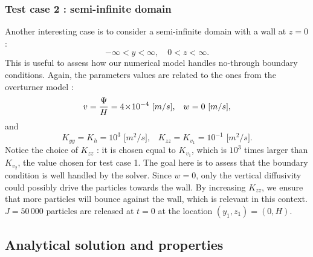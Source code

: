 \subsubsection{Test case 2 : semi-infinite domain}
Another interesting case is to consider a semi-infinite domain with a wall at $z=0$ :
\begin{equation}
	-\infty < y < \infty,\quad 0 < z < \infty.
\end{equation}
This is useful to assess how our numerical model handles no-through boundary conditions. Again, the parameters values are related to the ones from the overturner model :
\begin{equation}
	v = \frac{\Psi}{H} = 4\!\times\!10^{-4}\mbox{ [$m/s$],}\quad  w = 0\mbox{ [$m/s$],}
\end{equation}
and
\begin{equation}
	K_{yy} = K_h = 10^{3} \mbox{ [$m^2/s$],}\quad K_{zz} = K_{v_{1}} = 10^{-1} \mbox{ [$m^2/s$].} 
\end{equation}
Notice the choice  of $K_{zz}$ : it is chosen equal to $K_{v_1}$, which is $10^3$ times larger than $K_{v_2}$, the value chosen for test case 1. The goal here is to assess that the boundary condition is well handled by the solver. Since $w=0$, only the vertical diffusivity could possibly drive the particles towards the wall. By increasing $K_{zz}$, we ensure that more particles will bounce against the wall, which is relevant in this context. $J = 50\,000$ particles are released at $t=0$ at the location $(y_1,z_1) = (0,H)$.



\subsection{Analytical solution and properties}
